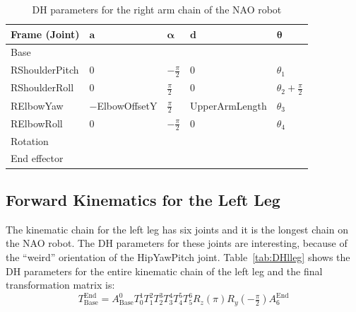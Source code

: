 \begin{table}[!t]
\centering
\caption{DH parameters for the right arm chain of the NAO robot}
\label{tab:DHrarm}
\begin{tabular}{|l|>{\centering\arraybackslash}m{2.55cm}|>{\centering\arraybackslash}m{2.55cm}|>{\centering\arraybackslash}m{2.85cm}|>{\centering\arraybackslash}m{2.55cm}|}
\hline
\textbf{Frame (Joint)} & $\mathbf{a}$ & $\boldsymbol{\alpha}$ & $\mathbf{d}$ & $\boldsymbol{\theta}$\\ \hline
Base & \multicolumn{4}{c|}{$A(0,\text{\footnotesize{$-$ShoulderOffsetY}},\text{\footnotesize{ShoulderOffsetZ}})$} \\ \hline
RShoulderPitch & $0$ & $-\frac{\pi}{2}$ & $0$ & $\theta_1$ \\ \hline
RShoulderRoll & $0$ & $\frac{\pi}{2}$ & $0$ & $\theta_2 + \frac{\pi}{2}$ \\ \hline
RElbowYaw & $-$\footnotesize{ElbowOffsetY} & $\frac{\pi}{2}$ & \footnotesize{UpperArmLength} & $\theta_3$ \\ \hline
RElbowRoll & $0$ & $-\frac{\pi}{2}$ & $0$ & $\theta_4$ \\ \hline
Rotation & \multicolumn{4}{c|}{$R_z(-\frac{\pi}{2})$} \\ \hline
End effector & \multicolumn{4}{c|}{$A(\text{\footnotesize{HandOffsetX+ LowerArmLength}},0,0)$} \\ \hline
\end{tabular}
\end{table}



\subsection{Forward Kinematics for the Left Leg}
The kinematic chain for the left leg has six joints and it is the longest chain on the NAO robot. The DH parameters for these joints are interesting, because of the ``weird'' orientation of the HipYawPitch joint. Table~\ref{tab:DHlleg} shows the DH parameters for the entire kinematic chain of the left leg and the final transformation matrix is:
\[
T^\text{End}_\text{Base} = A^0_\text{Base}T^1_0T^2_1T^3_2T^4_3T^5_4T^6_5R_z(\pi)R_y(-\tfrac{\pi}{2})A^\text{End}_{6}
\]

